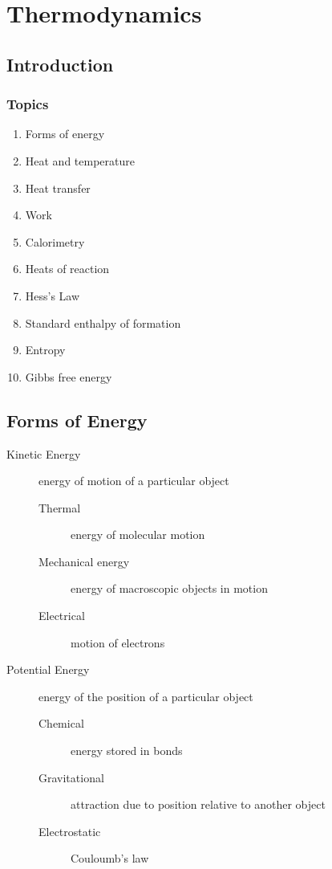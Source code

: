 \chapter{Thermodynamics}
\section{Introduction}
\subsection{Topics}
\begin{enumerate}
  \item Forms of energy
  \item Heat and temperature
  \item Heat transfer
  \item Work
  \item Calorimetry
  \item Heats of reaction
  \item Hess's Law
  \item Standard enthalpy of formation
  \item Entropy
  \item Gibbs free energy
\end{enumerate}

\section{Forms of Energy}
\begin{description}
  \item[Kinetic Energy] energy of motion of a particular object
    \begin{description}
      \item[Thermal] energy of molecular motion
      \item[Mechanical energy] energy of macroscopic objects in motion
      \item[Electrical] motion of electrons
    \end{description}
  \item[Potential Energy] energy of the position of a particular object
    \begin{description}
      \item[Chemical] energy stored in bonds
      \item[Gravitational] attraction due to position relative to another
        object
      \item[Electrostatic] Couloumb's law
    \end{description}
\end{description}

